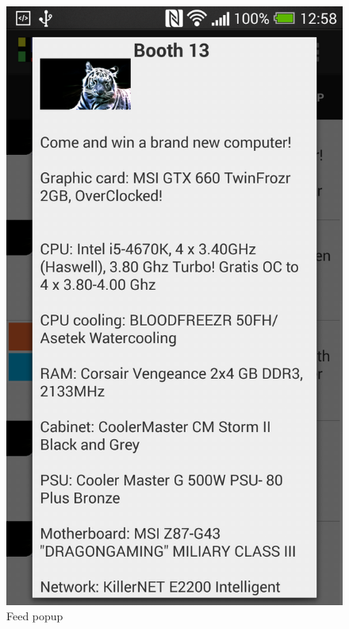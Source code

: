\begin{figure}[H]
\begin{minipage}[b]{0.5\columnwidth}
\centering
\includegraphics[width=\columnwidth]{img/finaldesign/feedspopup.png}
\caption{Feed popup}
\label{fig:popupfeed}
\end{minipage}
\hspace{0.5cm}
\begin{minipage}[b]{0.5\columnwidth}
\centering

\end{minipage}
\end{figure}
